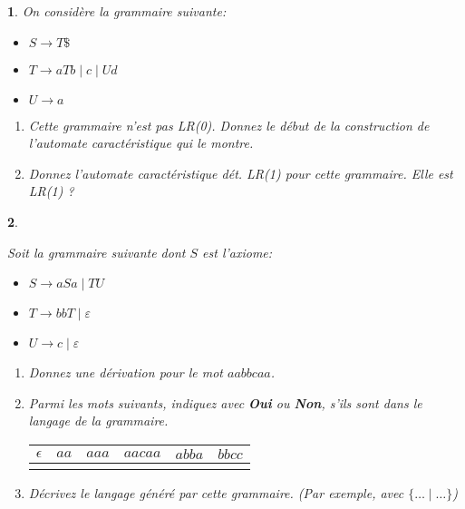 \documentclass[a4paper,10pt,french]{article}
\def\mybox#1#2{\fbox{\parbox[b][#1][b]{#2}{~}}}
\newtheorem{exi}{}
\newenvironment{exo}{\begin{exi}\em}{\end{exi}}
\begin{document}
\begin{exo}
On considère la grammaire suivante:
\begin{itemize}
\item[] $S \rightarrow T\$$
\item[] $T \rightarrow aTb \mid c \mid Ud$
\item[] $U \rightarrow a$
\end{itemize}

\begin{enumerate}
\item Cette grammaire n'est pas LR(0). Donnez le début de la construction
de l'automate caractéristique qui le montre.

\mybox{4cm}{\linewidth}

\item Donnez l'automate caractéristique dét. LR(1) pour cette
grammaire. Elle est LR(1) ?

\mybox{9cm}{\linewidth}

\end{enumerate}

\end{exo}

\begin{exo}

  Soit la grammaire suivante dont $S$ est l'axiome:
\begin{itemize}
\item[] $S \rightarrow aSa \mid TU$
\item[]   $T \rightarrow bbT\mid \varepsilon $
\item[]   $U \rightarrow c\mid \varepsilon $
\end{itemize}


\begin{enumerate}
\item Donnez une dérivation pour le mot $aabbcaa$.
  
\mybox{1cm}{\linewidth}

\item Parmi les mots suivants, indiquez avec {\bf Oui} ou {\bf Non}, s'ils sont
dans le langage de la grammaire.

\begin{tabular}{|c|c|c|c|c|c|}
\hline
\hspace*{2ex}$\epsilon$\hspace*{2ex}&$aa$&$aaa$&$aacaa$&$abba$&$bbcc$\\
\hline
&&&&&\\
\hline
\end{tabular}

\item
  Décrivez le langage généré par cette grammaire. (Par exemple, avec $\{\ldots \mid\ldots \}$)
  
 \mybox{1.5cm}{\linewidth}

 
\end{enumerate}

 \end{exo}
\end{document}
